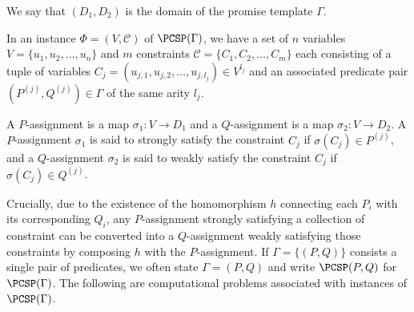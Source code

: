 We say that $(D_1,D_2)$ is the domain of the promise template $\Gamma$.

\begin{definition}
	In an instance $\Phi=(V,\mathcal{C})$ of $\PCSP(\Gamma)$, we have a set of $n$ variables $V =\{u_1, u_2, \ldots, u_n\}$ and $m$ constraints $\mathcal{C}=\{C_1, C_2, \ldots, C_m\}$ 
each consisting of a tuple of variables $C_j = (u_{j,1}, u_{j,2}, \ldots, u_{j,{l_j}}) \in V^{l_j}$ and an associated predicate pair $(P^{(j)},Q^{(j)}) \in \Gamma$ of the same arity $l_j$.

{A $P$-assignment is a map $\sigma_1 : V \rightarrow D_1$ and a $Q$-assignment is a map $\sigma_2 : V \rightarrow D_2$.} A {$P$}-assignment {$\sigma_1$} is said to strongly satisfy the constraint $C_j$ if $\sigma(C_j)\in P^{(j)}$, and {a $Q$-assignment $\sigma_2$} is said to weakly satisfy the constraint $C_j$ if $\sigma(C_j) \in Q^{(j)}$.
\end{definition}

{Crucially, due to the existence of the homomorphism $h$ connecting each $P_i$ with its corresponding $Q_i$, any $P$-assignment strongly satisfying a collection of constraint can be converted into a $Q$-assignment weakly satisfying those constraints by composing $h$ with the $P$-assignment.} {If $\Gamma = \{(P,Q)\}$ consists a single pair of predicates, we often state $\Gamma = (P,Q)$ and write $\PCSP(P, Q)$ for $\PCSP(\Gamma)$.} The following are computational problems associated with {instances of} $\PCSP(\Gamma)$. 

